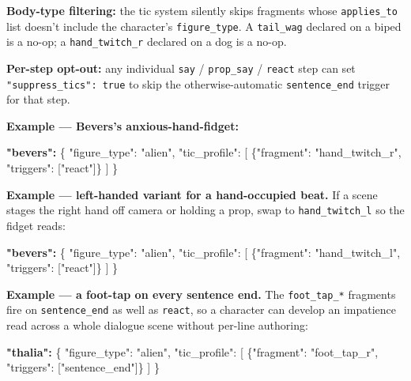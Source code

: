\documentclass[
  11pt,
]{book}
\newenvironment{Shaded}{}{}
\newcommand{\DataTypeTok}[1]{\textcolor[rgb]{0.56,0.13,0.00}{#1}}
\newcommand{\ErrorTok}[1]{\textcolor[rgb]{1.00,0.00,0.00}{\textbf{#1}}}
\newcommand{\FunctionTok}[1]{\textcolor[rgb]{0.02,0.16,0.49}{#1}}
\newcommand{\OtherTok}[1]{\textcolor[rgb]{0.00,0.44,0.13}{#1}}
\newcommand{\StringTok}[1]{\textcolor[rgb]{0.25,0.44,0.63}{#1}}
\begin{document}
\textbf{Body-type filtering:} the tic system silently skips fragments
whose \texttt{applies\_to} list doesn't include the character's
\texttt{figure\_type}. A \texttt{tail\_wag} declared on a biped is a
no-op; a \texttt{hand\_twitch\_r} declared on a dog is a no-op.

\textbf{Per-step opt-out:} any individual \texttt{say} /
\texttt{prop\_say} / \texttt{react} step can set
\texttt{"suppress\_tics":\ true} to skip the otherwise-automatic
\texttt{sentence\_end} trigger for that step.

\textbf{Example --- Bevers's anxious-hand-fidget:}

\begin{Shaded}
\begin{Highlighting}[]
\ErrorTok{"bevers":} \FunctionTok{\{}
  \DataTypeTok{"figure\_type"}\FunctionTok{:} \StringTok{"alien"}\FunctionTok{,}
  \DataTypeTok{"tic\_profile"}\FunctionTok{:} \OtherTok{[}
    \FunctionTok{\{}\DataTypeTok{"fragment"}\FunctionTok{:} \StringTok{"hand\_twitch\_r"}\FunctionTok{,} \DataTypeTok{"triggers"}\FunctionTok{:} \OtherTok{[}\StringTok{"react"}\OtherTok{]}\FunctionTok{\}}
  \OtherTok{]}
\FunctionTok{\}}
\end{Highlighting}
\end{Shaded}

\textbf{Example --- left-handed variant for a hand-occupied beat.}
If a scene stages the right hand off camera or holding a prop, swap
to \texttt{hand\_twitch\_l} so the fidget reads:

\begin{Shaded}
\begin{Highlighting}[]
\ErrorTok{"bevers":} \FunctionTok{\{}
  \DataTypeTok{"figure\_type"}\FunctionTok{:} \StringTok{"alien"}\FunctionTok{,}
  \DataTypeTok{"tic\_profile"}\FunctionTok{:} \OtherTok{[}
    \FunctionTok{\{}\DataTypeTok{"fragment"}\FunctionTok{:} \StringTok{"hand\_twitch\_l"}\FunctionTok{,} \DataTypeTok{"triggers"}\FunctionTok{:} \OtherTok{[}\StringTok{"react"}\OtherTok{]}\FunctionTok{\}}
  \OtherTok{]}
\FunctionTok{\}}
\end{Highlighting}
\end{Shaded}

\textbf{Example --- a foot-tap on every sentence end.} The
\texttt{foot\_tap\_*} fragments fire on \texttt{sentence\_end} as well
as \texttt{react}, so a character can develop an impatience read across
a whole dialogue scene without per-line authoring:

\begin{Shaded}
\begin{Highlighting}[]
\ErrorTok{"thalia":} \FunctionTok{\{}
  \DataTypeTok{"figure\_type"}\FunctionTok{:} \StringTok{"alien"}\FunctionTok{,}
  \DataTypeTok{"tic\_profile"}\FunctionTok{:} \OtherTok{[}
    \FunctionTok{\{}\DataTypeTok{"fragment"}\FunctionTok{:} \StringTok{"foot\_tap\_r"}\FunctionTok{,} \DataTypeTok{"triggers"}\FunctionTok{:} \OtherTok{[}\StringTok{"sentence\_end"}\OtherTok{]}\FunctionTok{\}}
  \OtherTok{]}
\FunctionTok{\}}
\end{Highlighting}
\end{Shaded}
\end{document}
